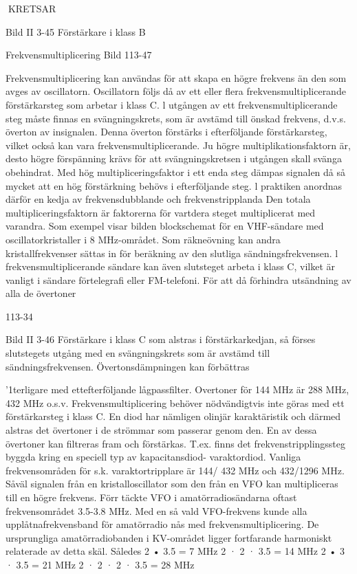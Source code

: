 \documentclass[a4paper,twoside,twocolumn,openright]{book}
\begin{document}
{{{{{{{KRETSAR

Bild II 3-45 Förstärkare i klass B

Frekvensmultiplicering
Bild 113-47

Frekvensmultiplicering kan användas för att
skapa en högre frekvens än den som avges
av oscillatorn. Oscillatorn följs då av ett eller
flera frekvensmultiplicerande förstärkarsteg
som arbetar i klass C.
l utgången av ett frekvensmultiplicerande steg måste finnas en svängningskrets,
som är avstämd till önskad frekvens, d.v.s.
överton av insignalen. Denna överton förstärks i efterföljande förstärkarsteg, vilket
också kan vara frekvensmultiplicerande.
Ju högre multiplikationsfaktorn är, desto
högre förspänning krävs för att svängningskretsen i utgången skall svänga obehindrat.
Med hög multipliceringsfaktor i ett enda steg
dämpas signalen då så mycket att en hög
förstärkning behövs i efterföljande steg. l
praktiken anordnas därför en kedja av frekvensdubblande och frekvenstripplanda
Den totala multipliceringsfaktorn är faktorerna för vartdera steget multiplicerat med varandra.
Som exempel visar bilden blockschemat
för en VHF-sändare med oscillatorkristaller i
8 MHz-området. Som räkneövning kan andra kristallfrekvenser sättas in för beräkning
av den slutliga sändningsfrekvensen. l frekvensmultiplicerande sändare kan även slutsteget arbeta i klass C, vilket är vanligt i
sändare förtelegrafi eller FM-telefoni. För att
då förhindra utsändning av alla de övertoner

113-34

Bild II 3-46 Förstärkare i klass C
som alstras i förstärkarkedjan, så förses
slutstegets utgång med en svängningskrets
som är avstämd till sändningsfrekvensen.
Övertonsdämpningen kan förbättras }'1terligare med ettefterföljande lågpassfilter. Overtoner för 144 MHz är 288 MHz, 432 MHz
o.s.v.
Frekvensmultiplicering behöver nödvändigtvis inte göras med ett förstärkarsteg i
klass C. En diod har nämligen olinjär karaktäristik och därmed alstras det övertoner i de
strömmar som passerar genom den. En av
dessa övertoner kan filtreras fram och förstärkas. T.ex. finns det frekvenstripplingssteg byggda kring en speciell typ av kapacitansdiod- varaktordiod. Vanliga frekvensområden för s.k. varaktortripplare är 144/
432 MHz och 432/1296 MHz.
Såväl signalen från en kristalloscillator
som den från en VFO kan multipliceras till en
högre frekvens.
Förr täckte VFO i amatörradiosändarna
oftast frekvensområdet 3.5-3.8 MHz. Med
en så vald VFO-frekvens kunde alla upplåtnafrekvensband för amatörradio nås med
frekvensmultiplicering. De ursprungliga amatörradiobanden i KV-området ligger fortfarande harmoniskt relaterade av detta skäl.
Således
2 • 3.5 = 7 MHz
2 · 2 · 3.5 = 14 MHz
2 • 3 · 3.5 = 21 MHz
2 · 2 · 2 · 3.5 = 28 MHz

}}}}}}
\end{document}
